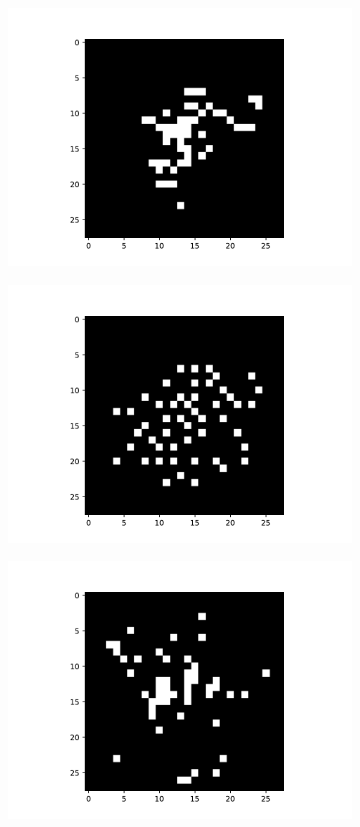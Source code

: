 \documentclass[a4paper,twocolumn]{article} %
\begin{document}
\begin{figure}[h!]
\begin{subfigure}[t]{0.19\linewidth}
        \includegraphics[width=\linewidth]{figures/best_seed_gl.pdf}
    \end{subfigure}
    \hfill
    \begin{subfigure}[t]{0.19\linewidth}
        \includegraphics[width=\linewidth]{figures/best_seed_seql.pdf}
    \end{subfigure}
    \hfill
    \begin{subfigure}[t]{0.19\linewidth}
        \includegraphics[width=\linewidth]{figures/best_seed_omp.pdf}

\end{subfigure}
\end{figure}
\end{document}

